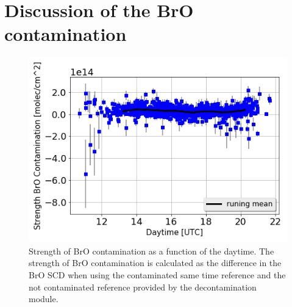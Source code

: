 \documentclass  [
  paper    = a4,
  BCOR     = 10mm,
  twoside,
  fontsize = 12pt,
  fleqn,
  toc      = bibnumbered,
  toc      = listofnumbered,
  numbers  = noendperiod,
  headings = normal,
  listof   = leveldown,
  version  = 3.03
]                                       {scrreprt}
\begin{document}
\section{Discussion of the BrO contamination}
	\begin{figure}
		\centering
		\includegraphics[width=0.6\linewidth]{Bilder/bro_contdaytime}
		\caption{Strength of BrO contamination as a function of the daytime. The strength of BrO contamination is calculated as the difference in the BrO SCD when using the contaminated same time reference and the not contaminated reference provided by the decontamination module.}
		\label{fig:brocontdaytime}
	\end{figure}
	
\end{document}
